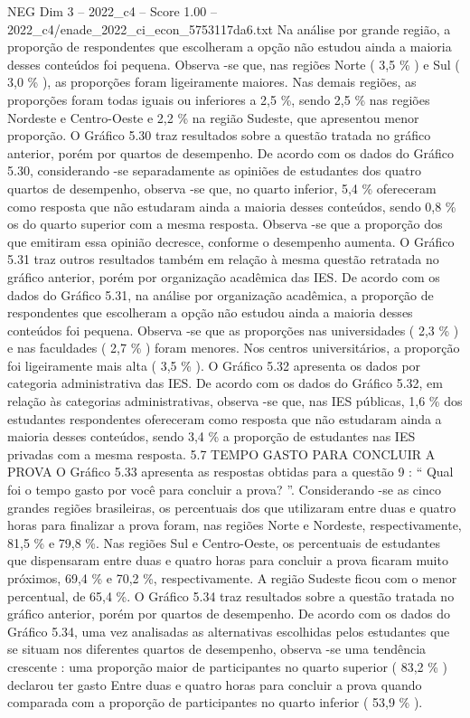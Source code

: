 \begin{textsample}{NEG Dim 3 – 2022\_c4 – Score 1.00 – 2022\_c4/enade\_2022\_ci\_econ\_5753117da6.txt}
Na análise por grande região, a proporção de respondentes que escolheram a opção não estudou ainda a maioria desses conteúdos foi pequena.
Observa -se que, nas regiões Norte ( 3,5 \% ) e Sul ( 3,0 \% ), as proporções foram ligeiramente maiores.
Nas demais regiões, as proporções foram todas iguais ou inferiores a 2,5 \%, sendo 2,5 \% nas regiões Nordeste e Centro-Oeste e 2,2 \% na região Sudeste, que apresentou menor proporção.
O Gráfico 5.30 traz resultados sobre a questão tratada no gráfico anterior, porém por quartos de desempenho.
De acordo com os dados do Gráfico 5.30, considerando -se separadamente as opiniões de estudantes dos quatro quartos de desempenho, observa -se que, no quarto inferior, 5,4 \% ofereceram como resposta que não estudaram ainda a maioria desses conteúdos, sendo 0,8 \% os do quarto superior com a mesma resposta.
Observa -se que a proporção dos que emitiram essa opinião decresce, conforme o desempenho aumenta.
O Gráfico 5.31 traz outros resultados também em relação à mesma questão retratada no gráfico anterior, porém por organização acadêmica das IES.
De acordo com os dados do Gráfico 5.31, na análise por organização acadêmica, a proporção de respondentes que escolheram a opção não estudou ainda a maioria desses conteúdos foi pequena.
Observa -se que as proporções nas universidades ( 2,3 \% ) e nas faculdades ( 2,7 \% ) foram menores.
Nos centros universitários, a proporção foi ligeiramente mais alta ( 3,5 \% ).
O Gráfico 5.32 apresenta os dados por categoria administrativa das IES.
De acordo com os dados do Gráfico 5.32, em relação às categorias administrativas, observa -se que, nas IES públicas, 1,6 \% dos estudantes respondentes ofereceram como resposta que não estudaram ainda a maioria desses conteúdos, sendo 3,4 \% a proporção de estudantes nas IES privadas com a mesma resposta. 5.7 TEMPO GASTO PARA CONCLUIR A PROVA O Gráfico 5.33 apresenta as respostas obtidas para a questão 9 : “ Qual foi o tempo gasto por você para concluir a prova? ”.
Considerando -se as cinco grandes regiões brasileiras, os percentuais dos que utilizaram entre duas e quatro horas para finalizar a prova foram, nas regiões Norte e Nordeste, respectivamente, 81,5 \% e 79,8 \%.
Nas regiões Sul e Centro-Oeste, os percentuais de estudantes que dispensaram entre duas e quatro horas para concluir a prova ficaram muito próximos, 69,4 \% e 70,2 \%, respectivamente.
A região Sudeste ficou com o menor percentual, de 65,4 \%.
O Gráfico 5.34 traz resultados sobre a questão tratada no gráfico anterior, porém por quartos de desempenho.
De acordo com os dados do Gráfico 5.34, uma vez analisadas as alternativas escolhidas pelos estudantes que se situam nos diferentes quartos de desempenho, observa -se uma tendência crescente : uma proporção maior de participantes no quarto superior ( 83,2 \% ) declarou ter gasto Entre duas e quatro horas para concluir a prova quando comparada com a proporção de participantes no quarto inferior ( 53,9 \% ).

\end{textsample}
